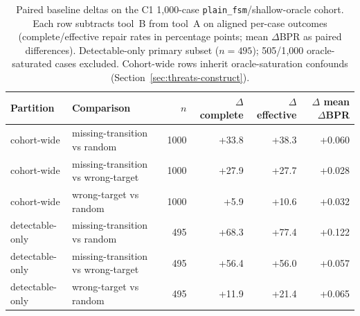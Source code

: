 \begin{table}[t]
\caption{Paired baseline deltas on the C1 1{,}000-case \texttt{plain\_fsm}/shallow-oracle cohort. Each row subtracts tool~B from tool~A on aligned per-case outcomes (complete/effective repair rates in percentage points; mean $\Delta$BPR as paired differences). Detectable-only primary subset ($n=495$); 505/1{,}000 oracle-saturated cases excluded. Cohort-wide rows inherit oracle-saturation confounds (Section~\ref{sec:threats-construct}).}
\label{tab:baseline-delta-summary}
\begin{tabular}{@{}llrrrr@{}}
\toprule
Partition & Comparison & $n$ & $\Delta$ complete & $\Delta$ effective & $\Delta$ mean $\Delta$BPR \\
\midrule
cohort-wide & missing-transition vs random & 1000 & +33.8 & +38.3 & +0.060 \\
cohort-wide & missing-transition vs wrong-target & 1000 & +27.9 & +27.7 & +0.028 \\
cohort-wide & wrong-target vs random & 1000 & +5.9 & +10.6 & +0.032 \\
detectable-only & missing-transition vs random & 495 & +68.3 & +77.4 & +0.122 \\
detectable-only & missing-transition vs wrong-target & 495 & +56.4 & +56.0 & +0.057 \\
detectable-only & wrong-target vs random & 495 & +11.9 & +21.4 & +0.065 \\
\bottomrule
\end{tabular}
\end{table}
